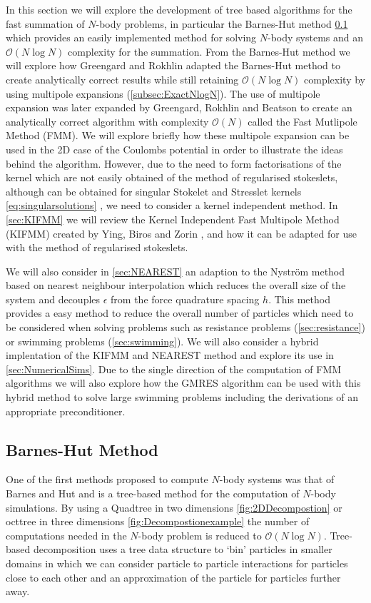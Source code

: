 In this section we will explore the development of tree based algorithms for the fast summation of $N$-body problems, in particular the Barnes-Hut method \cite{Barnes1986} \cref{subsec:BarnesHut} which provides an easily implemented method for solving $N$-body systems and an $\mathcal{O}(N\log N)$ complexity for the summation. From the Barnes-Hut method we will explore how Greengard and Rokhlin \cite{1988The0-262-7110-X.,Rokhlin1985RapidTheory,Greengard1987ASimulations} adapted the Barnes-Hut method to create analytically correct results while still retaining $\mathcal{O}(N\log N)$ complexity by using multipole expansions (\cref{subsec:ExactNlogN}). The use of multipole expansion was later expanded by Greengard, Rokhlin and Beatson \cite{Beatson,Greengard1987ASimulations} to create an analytically correct algorithm with complexity $\mathcal{O}(N)$ called the Fast Mutlipole Method (FMM). We will explore briefly how these multipole expansion can be used in the 2D case of the Coulombs potential in order to illustrate the ideas behind the algorithm. However, due to the need to form factorisations of the kernel which are not easily obtained of the method of regularised stokeslets, although can be obtained for singular Stokelet and Stresslet kernels \cref{eq:singularsolutions} \cite{Tornberg2008}, we need to consider a kernel independent method. In \cref{sec:KIFMM} we will review the Kernel Independent Fast Multipole Method (KIFMM) created by Ying, Biros and Zorin \cite{Ying2004}, and how it can be adapted for use with the method of regularised stokeslets. 

We will also consider in \cref{sec:NEAREST} an adaption to the Nyström method based on nearest neighbour interpolation which reduces the overall size of the system and decouples $\epsilon$ from the force quadrature spacing $h$. This method provides a easy method to reduce the overall number of particles which need to be considered when solving problems such as resistance problems (\cref{sec:resistance}) or swimming problems (\cref{sec:swimming}).
We will also consider a hybrid implentation of the KIFMM and NEAREST method and explore its use in \cref{sec:NumericalSims}. Due to the single direction of the computation of FMM algorithms we will also explore how the GMRES algorithm can be used with this hybrid method to solve large swimming problems including the derivations of an appropriate preconditioner.  

\subsection{Barnes-Hut Method} \label{subsec:BarnesHut}
One of the first methods proposed to compute $N$-body systems was that of Barnes and Hut \cite{Barnes1986} and is a tree-based method for the computation of $N$-body simulations. By using a Quadtree in two dimensions \cref{fig:2DDecompostion} or octtree in three dimensions \cref{fig:Decompostionexample} the number of computations needed in the $N$-body problem is reduced to $\mathcal{O}(N\log N)$. Tree-based decomposition uses a tree data structure to `bin' particles in smaller domains in which we can consider particle to particle interactions for particles close to each other and an approximation of the particle for particles further away. 


